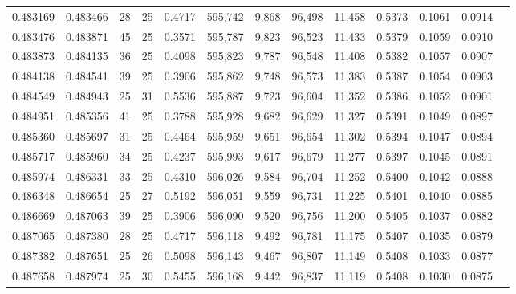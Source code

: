 \begin{tabular}{rrrrrrrrrrrrr}
0.483169 & 0.483466 &    28 &  25 &                                     0.4717 & 595,742 &   9,868 &  96,498 &  11,458 & 0.5373 & 0.1061 & 0.0914 \\
0.483476 & 0.483871 &    45 &  25 &                                     0.3571 & 595,787 &   9,823 &  96,523 &  11,433 & 0.5379 & 0.1059 & 0.0910 \\
0.483873 & 0.484135 &    36 &  25 &                                     0.4098 & 595,823 &   9,787 &  96,548 &  11,408 & 0.5382 & 0.1057 & 0.0907 \\
0.484138 & 0.484541 &    39 &  25 &                                     0.3906 & 595,862 &   9,748 &  96,573 &  11,383 & 0.5387 & 0.1054 & 0.0903 \\
0.484549 & 0.484943 &    25 &  31 &                                     0.5536 & 595,887 &   9,723 &  96,604 &  11,352 & 0.5386 & 0.1052 & 0.0901 \\
0.484951 & 0.485356 &    41 &  25 &                                     0.3788 & 595,928 &   9,682 &  96,629 &  11,327 & 0.5391 & 0.1049 & 0.0897 \\
0.485360 & 0.485697 &    31 &  25 &                                     0.4464 & 595,959 &   9,651 &  96,654 &  11,302 & 0.5394 & 0.1047 & 0.0894 \\
0.485717 & 0.485960 &    34 &  25 &                                     0.4237 & 595,993 &   9,617 &  96,679 &  11,277 & 0.5397 & 0.1045 & 0.0891 \\
0.485974 & 0.486331 &    33 &  25 &                                     0.4310 & 596,026 &   9,584 &  96,704 &  11,252 & 0.5400 & 0.1042 & 0.0888 \\
0.486348 & 0.486654 &    25 &  27 &                                     0.5192 & 596,051 &   9,559 &  96,731 &  11,225 & 0.5401 & 0.1040 & 0.0885 \\
0.486669 & 0.487063 &    39 &  25 &                                     0.3906 & 596,090 &   9,520 &  96,756 &  11,200 & 0.5405 & 0.1037 & 0.0882 \\
0.487065 & 0.487380 &    28 &  25 &                                     0.4717 & 596,118 &   9,492 &  96,781 &  11,175 & 0.5407 & 0.1035 & 0.0879 \\
0.487382 & 0.487651 &    25 &  26 &                                     0.5098 & 596,143 &   9,467 &  96,807 &  11,149 & 0.5408 & 0.1033 & 0.0877 \\
0.487658 & 0.487974 &    25 &  30 &                                     0.5455 & 596,168 &   9,442 &  96,837 &  11,119 & 0.5408 & 0.1030 & 0.0875 \\

\end{tabular}
